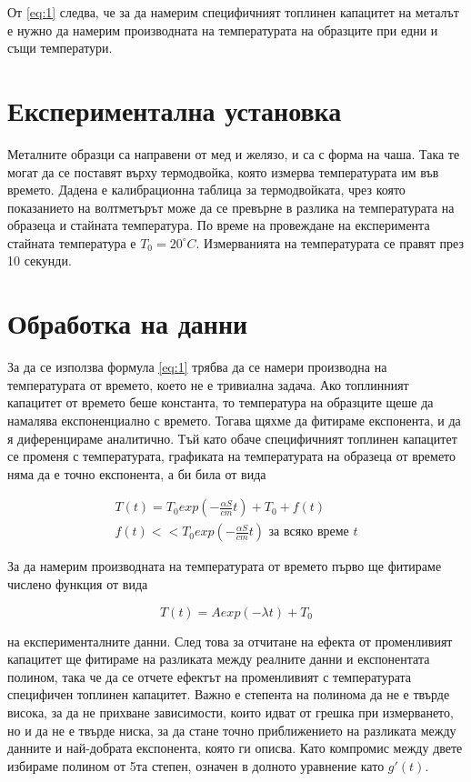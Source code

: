 \documentclass[
 reprint,
 amsmath,amssymb,
 aps,
]{revtex4-2}
\newcommand{\degree}{^{\circ}}
\begin{document}
От \eqref{eq:1} следва, че за да намерим специфичният топлинен капацитет на металът е нужно да намерим производната на температурата на образците при едни и същи температури. 

\section{Експериментална установка}

Металните образци са направени от мед и желязо, и са с форма на чаша. Така те могат да се поставят върху термодвойка, която измерва температурата им във времето. Дадена е калибрационна таблица за термодвойката, чрез която показанието на волтметърът може да се превърне в разлика на температурата на образеца и стайната температура. По време на провеждане на експеримента стайната температура е $T_0 = 20\degree C$. Измерванията на температурата се правят през 10 секунди. 

\section{Обработка на данни}

За да се използва формула \eqref{eq:1} трябва да се намери производна на температурата от времето, което не е тривиална задача. Ако топлинният капацитет от времето беше константа, то температура на образците щеше да намалява експоненциално с времето. Тогава щяхме да фитираме експонента, и да я диференцираме аналитично. Тъй като обаче специфичният топлинен капацитет се променя с температурата, графиката на температурата на образеца от времето няма да е точно експонента, а би била от вида

\begin{gather*}
    T(t) = T_0 exp(-\frac{\alpha S}{cm}t) + T_0 + f(t) \\
    f(t) << T_0 exp(-\frac{\alpha S}{cm}t) \text{ за всяко време } t
\end{gather*}

За да намерим производната на температурата от времето първо ще фитираме числено функция от вида 

\begin{equation*}
    T(t) = A exp(-\lambda t) + T_0
\end{equation*}

на експерименталните данни. След това за отчитане на ефекта от променливият капацитет ще фитираме на разликата между реалните данни и експонентата полином, така че да се отчете ефектът на променливият с температурата специфичен топлинен капацитет. Важно е степента на полинома да не е твърде висока, за да не прихване зависимости, които идват от грешка при измерването, но и да не е твърде ниска, за да стане точно приближението на разликата между данните и най-добрата експонента, която ги описва. Като компромис между двете избираме полином от 5та степен, означен в долното уравнение като $g'(t)$.
\end{document}
